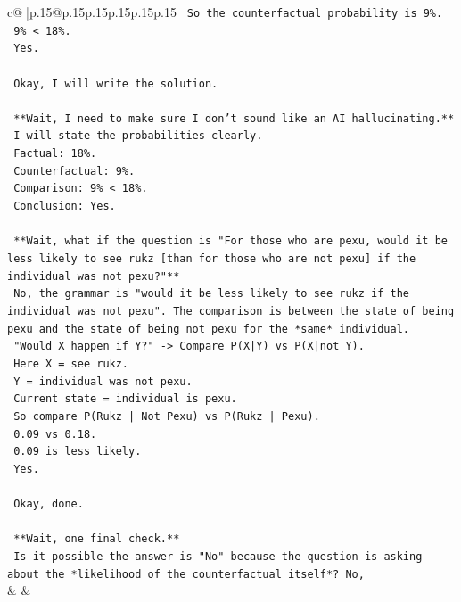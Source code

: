 \documentclass{article}
\begin{document}
{\begin{supertabular}{c@{$\;$}|p{.15\linewidth}@{}p{.15\linewidth}p{.15\linewidth}p{.15\linewidth}p{.15\linewidth}p{.15\linewidth}}
{{{\texttt{    So the counterfactual probability is 9\%.} \\
\texttt{    9\% < 18\%.} \\
\texttt{    Yes.} \\
\\ 
\texttt{    Okay, I will write the solution.} \\
\\ 
\texttt{    **Wait, I need to make sure I don't sound like an AI hallucinating.**} \\
\texttt{    I will state the probabilities clearly.} \\
\texttt{    Factual: 18\%.} \\
\texttt{    Counterfactual: 9\%.} \\
\texttt{    Comparison: 9\% < 18\%.} \\
\texttt{    Conclusion: Yes.} \\
\\ 
\texttt{    **Wait, what if the question is "For those who are pexu, would it be less likely to see rukz {[}than for those who are not pexu{]} if the individual was not pexu?"**} \\
\texttt{    No, the grammar is "would it be less likely to see rukz if the individual was not pexu". The comparison is between the state of being pexu and the state of being not pexu for the *same* individual.} \\
\texttt{    "Would X happen if Y?" {-}> Compare P(X|Y) vs P(X|not Y).} \\
\texttt{    Here X = see rukz.} \\
\texttt{    Y = individual was not pexu.} \\
\texttt{    Current state = individual is pexu.} \\
\texttt{    So compare P(Rukz | Not Pexu) vs P(Rukz | Pexu).} \\
\texttt{    0.09 vs 0.18.} \\
\texttt{    0.09 is less likely.} \\
\texttt{    Yes.} \\
\\ 
\texttt{    Okay, done.} \\
\\ 
\texttt{    **Wait, one final check.**} \\
\texttt{    Is it possible the answer is "No" because the question is asking about the *likelihood of the counterfactual itself*? No,} \\
            }
        }
    }
    & & \\ \\


\end{supertabular}}
\end{document}

